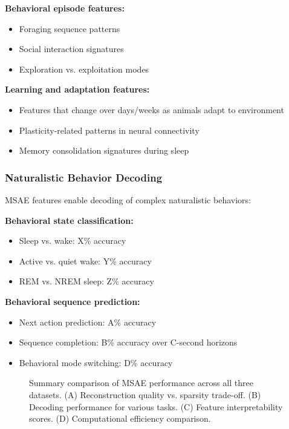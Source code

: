 \textbf{Behavioral episode features:}
\begin{itemize}
\item Foraging sequence patterns
\item Social interaction signatures
\item Exploration vs. exploitation modes
\end{itemize}

\textbf{Learning and adaptation features:}
\begin{itemize}
\item Features that change over days/weeks as animals adapt to environment
\item Plasticity-related patterns in neural connectivity
\item Memory consolidation signatures during sleep
\end{itemize}

\subsubsection{Naturalistic Behavior Decoding}

MSAE features enable decoding of complex naturalistic behaviors:

\textbf{Behavioral state classification:}
\begin{itemize}
\item Sleep vs. wake: X\% accuracy
\item Active vs. quiet wake: Y\% accuracy
\item REM vs. NREM sleep: Z\% accuracy
\end{itemize}

\textbf{Behavioral sequence prediction:}
\begin{itemize}
\item Next action prediction: A\% accuracy
\item Sequence completion: B\% accuracy over C-second horizons
\item Behavioral mode switching: D\% accuracy
\end{itemize}

\begin{figure}[h]
\centering
\caption{Summary comparison of MSAE performance across all three datasets. (A) Reconstruction quality vs. sparsity trade-off. (B) Decoding performance for various tasks. (C) Feature interpretability scores. (D) Computational efficiency comparison.}
\label{fig:summary}
\end{figure}

